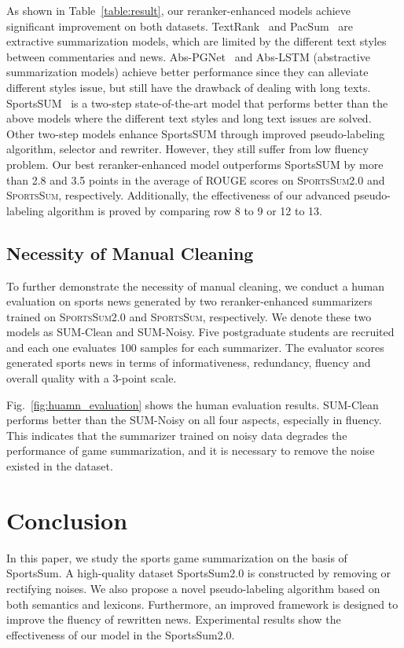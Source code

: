 As shown in Table~\ref{table:result}, our reranker-enhanced models achieve significant improvement on both datasets.
TextRank~\cite{Mihalcea2004TextRankBO} and PacSum~\cite{zheng-lapata-2019-sentence} are extractive summarization models, which are limited by the different text styles between commentaries and news. Abs-PGNet~\cite{See2017GetTT} and Abs-LSTM (abstractive summarization models) achieve better performance since they can alleviate different styles issue, but still have the drawback of dealing with long texts.
SportsSUM~\cite{Huang2020GeneratingSN} is a two-step state-of-the-art model that performs better than the above models where the different text styles and long text issues are solved. 
Other two-step models enhance SportsSUM through improved pseudo-labeling algorithm, selector and rewriter. However, they still suffer from low fluency problem. Our best reranker-enhanced model outperforms SportsSUM by more than 2.8 and 3.5 points in the average of ROUGE scores on \textsc{SportsSum2.0} and \textsc{SportsSum}, respectively.
Additionally, the effectiveness of our advanced pseudo-labeling algorithm is proved by comparing row 8 to 9 or 12 to 13.

\subsection{Necessity of Manual Cleaning}
To further demonstrate the necessity of manual cleaning, we conduct a human evaluation on sports news generated by two reranker-enhanced summarizers trained on \textsc{SportsSum2.0} and \textsc{SportsSum}, respectively. We denote these two models as SUM-Clean and SUM-Noisy. Five postgraduate students are recruited and each one evaluates 100 samples for each summarizer. The evaluator scores generated sports news in terms of informativeness, redundancy, fluency and overall quality with a 3-point scale.

Fig.~\ref{fig:huamn_evaluation} shows the human evaluation results. SUM-Clean performs better than the SUM-Noisy on all four aspects, especially in fluency. This indicates that the summarizer trained on noisy data degrades the performance of game summarization, and it is necessary to remove the noise existed in the dataset.

  
  
\section{Conclusion}
In this paper, we study the sports game summarization on the basis of SportsSum. A high-quality dataset SportsSum2.0 is constructed by removing or rectifying noises. We also propose a novel pseudo-labeling algorithm based on both semantics and lexicons. Furthermore, an improved framework is designed to improve the fluency of rewritten news. Experimental results show the effectiveness of our model in the SportsSum2.0.

